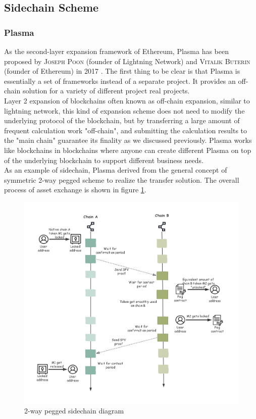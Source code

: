 \subsection{Sidechain Scheme}
\label{sec:side}


\subsubsection{Plasma}
\noindent As the second-layer expansion framework of Ethereum, Plasma has been proposed by \textsc{Joseph Poon} (founder of Lightning Network) and \textsc{Vitalik Buterin} (founder of Ethereum) in 2017 \cite{poon2017plasma}. The first thing to be clear is that Plasma is essentially a set of frameworks instead of a separate project. It provides an off-chain solution for a variety of different project real projects. \\
\noindent Layer 2 expansion of blockchains often known as off-chain expansion, similar to lightning network, this kind of expansion scheme does not need to modify the underlying protocol of the blockchain, but by transferring a large amount of frequent calculation work "off-chain", and submitting the calculation results to the "main chain" guarantee its finality as we discussed previously. Plasma works like blockchains in blockchains where anyone can create different Plasma on top of the underlying blockchain to support different business needs. \\
\noindent As an example of sidechain, Plasma derived from the general concept of symmetric 2-way pegged scheme to realize the transfer solution. The overall process of asset exchange is shown in figure \ref{fig:2way}. 
        \begin{figure}[H]
        \includegraphics[width=1\textwidth]{./figures/2way.png}
        \centering
        \caption{{2-way pegged sidechain diagram}\protect\footnotemark}
        \centering
        \label{fig:2way}
        
        \end{figure}

